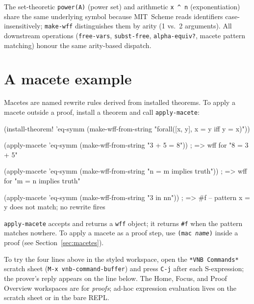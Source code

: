 %
\begin{remark}\label{remark:27135-34761-138906}
%
The set-theoretic \texttt{power(A)} (power set) and arithmetic
\texttt{x \^{} n} (exponentiation) share the same underlying symbol because
MIT~Scheme reads identifiers case-insensitively; \texttt{make-wff}
distinguishes them by arity (1 vs.\ 2 arguments).  All downstream
operations (\texttt{free-vars}, \texttt{subst-free},
\texttt{alpha-equiv?}, macete pattern matching) honour the same
arity-based dispatch.

%
\end{remark}

\section{A macete example}
\label{sec:quickstart-macete}

Macetes are named rewrite rules derived from installed theorems.
To apply a macete outside a proof, install a theorem and call
\texttt{apply-macete}:

\begin{VNBcode}
(install-theorem! 'eq-symm
  (make-wff-from-string "forall([x, y], x = y iff y = x)"))

(apply-macete 'eq-symm (make-wff-from-string "3 + 5 = 8"))
; => wff for "8 = 3 + 5"

(apply-macete 'eq-symm (make-wff-from-string "n = m implies truth"))
; => wff for "m = n implies truth"

(apply-macete 'eq-symm (make-wff-from-string "3 in nn"))
; => #f          -- pattern x = y does not match; no rewrite fires
\end{VNBcode}

\texttt{apply-macete} accepts and returns a \texttt{wff} object; it
returns \texttt{\#f} when the pattern matches nowhere.
To apply a macete as a proof step, use
\texttt{(mac \textit{name})} inside a proof (see
Section~\ref{sec:macetes}).

\begin{remark}
To try the four lines above in the styled workspace, open the
\texttt{*VNB Commands*} scratch sheet (\texttt{M-x vnb-command-buffer})
and press \texttt{C-j} after each S-expression; the prover's reply
appears on the line below.  The Home, Focus, and Proof Overview
workspaces are for \emph{proofs}; ad-hoc expression evaluation lives
on the scratch sheet or in the bare REPL.
\end{remark}



